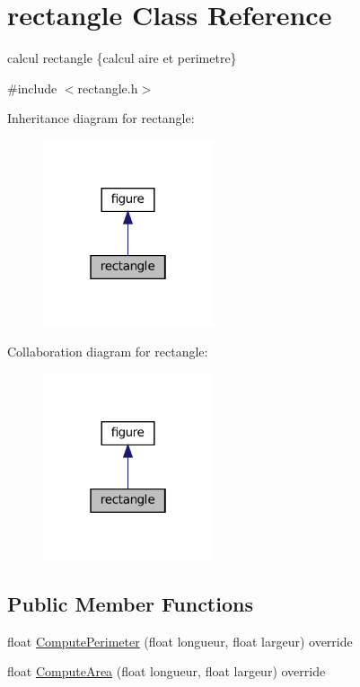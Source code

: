 \hypertarget{classrectangle}{}\section{rectangle Class Reference}
\label{classrectangle}


calcul rectangle \{calcul aire et perimetre\}  




{\ttfamily \#include $<$rectangle.\+h$>$}



Inheritance diagram for rectangle\+:
\nopagebreak
\begin{figure}[H]
\begin{center}
\leavevmode
\includegraphics[width=142pt]{classrectangle__inherit__graph}
\end{center}
\end{figure}


Collaboration diagram for rectangle\+:
\nopagebreak
\begin{figure}[H]
\begin{center}
\leavevmode
\includegraphics[width=142pt]{classrectangle__coll__graph}
\end{center}
\end{figure}
\subsection*{Public Member Functions}
\begin{DoxyCompactItemize}
\item 
float \hyperlink{classrectangle_ad9eb8dfdd783c528dd7a6011e0d89dcb}{Compute\+Perimeter} (float longueur, float largeur) override
\item 
float \hyperlink{classrectangle_a7dafa66d6ad61db0ba37c2b75ee50e4c}{Compute\+Area} (float longueur, float largeur) override
\end{DoxyCompactItemize}


